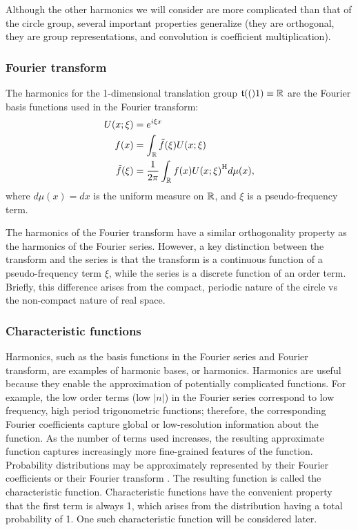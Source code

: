 \documentclass[../main.tex]{subfiles}
\begin{document}
\begin{refsection}
Although the other harmonics we will consider are more complicated than that of the circle group, several important properties generalize (they are orthogonal, they are group representations, and convolution is coefficient multiplication).

\subsubsection{Fourier transform}\label{fourier-transform}

The harmonics for the 1-dimensional translation group $\mathfrak{t}(()1) \equiv \mathbb{R}$ are the Fourier basis functions used in the Fourier transform:
\[
\begin{aligned}
  U(x; \xi) &= e^{i \xi x}\\
  f(x) &= \int_{\mathbb{R}} \tilde{f}(\xi) U(x;\xi)\\
  \tilde{f}(\xi) &= \frac{1}{2\pi} \int_{\mathbb{R}} f(x) {U(x; \xi)}^\mathrm{H} d\mu(x),\\
\end{aligned}
\]
where $d\mu(x)=dx$ is the uniform measure on $\mathbb{R}$, and $\xi$ is a pseudo-frequency term.

The harmonics of the Fourier transform have a similar orthogonality property as the harmonics of the Fourier series.
However, a key distinction between the transform and the series is that the transform is a continuous function of a pseudo-frequency term $\xi$, while the series is a discrete function of an order term.
Briefly, this difference arises from the compact, periodic nature of the circle vs the non-compact nature of real space.

\subsubsection{Characteristic functions}\label{characteristic-functions}

Harmonics, such as the basis functions in the Fourier series and Fourier transform, are examples of harmonic bases, or harmonics.
Harmonics are useful because they enable the approximation of potentially complicated functions.
For example, the low order terms (low $|n|$) in the Fourier series correspond to low frequency, high period trigonometric functions; therefore, the corresponding Fourier coefficients capture global or low-resolution information about the function.
As the number of terms used increases, the resulting approximate function captures increasingly more fine-grained features of the function.
Probability distributions may be approximately represented by their Fourier coefficients or their Fourier transform .
The resulting function is called the characteristic function.
Characteristic functions have the convenient property that the first term is always 1, which arises from the distribution having a total probability of 1.
One such characteristic function will be considered later.


\end{refsection}
\end{document}
